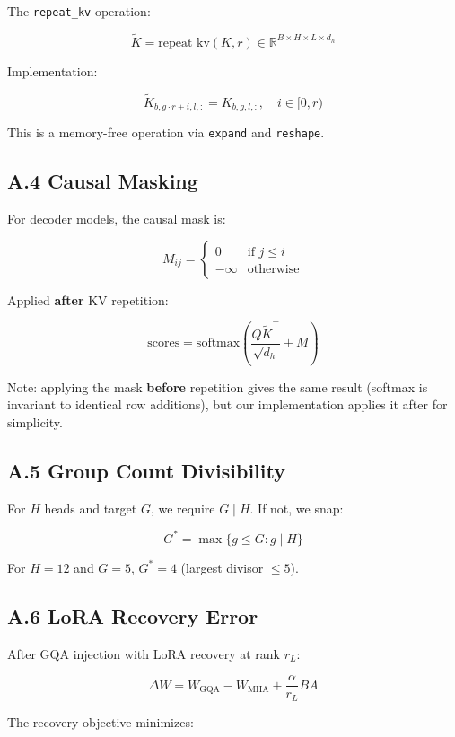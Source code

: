 The \texttt{repeat\_kv} operation:

\[
\tilde{K} = \text{repeat\_kv}(K, r) \in \mathbb{R}^{B \times H \times L \times d_h}
\tag{A.9}
\]

Implementation:

\[
\tilde{K}_{b, g \cdot r + i, l, :} = K_{b, g, l, :}, \quad i \in [0, r)
\tag{A.10}
\]

This is a memory-free operation via \texttt{expand} and \texttt{reshape}.

\subsection{A.4 Causal Masking}

For decoder models, the causal mask is:

\[
M_{ij} = \begin{cases} 0 & \text{if } j \le i \\ -\infty & \text{otherwise} \end{cases}
\tag{A.11}
\]

Applied \textbf{after} KV repetition:

\[
\text{scores} = \text{softmax}\!\left(\frac{Q \tilde{K}^\top}{\sqrt{d_h}} + M\right)
\tag{A.12}
\]

Note: applying the mask \textbf{before} repetition gives the same result 
(softmax is invariant to identical row additions), but our implementation 
applies it after for simplicity.

\subsection{A.5 Group Count Divisibility}

For $H$ heads and target $G$, we require $G \mid H$. If not, we snap:

\[
G^* = \max\{g \le G : g \mid H\}
\tag{A.13}
\]

For $H = 12$ and $G = 5$, $G^* = 4$ (largest divisor $\le 5$).

\subsection{A.6 LoRA Recovery Error}

After GQA injection with LoRA recovery at rank $r_L$:

\[
\Delta W = W_\text{GQA} - W_\text{MHA} + \frac{\alpha}{r_L} B A
\tag{A.14}
\]

The recovery objective minimizes:

